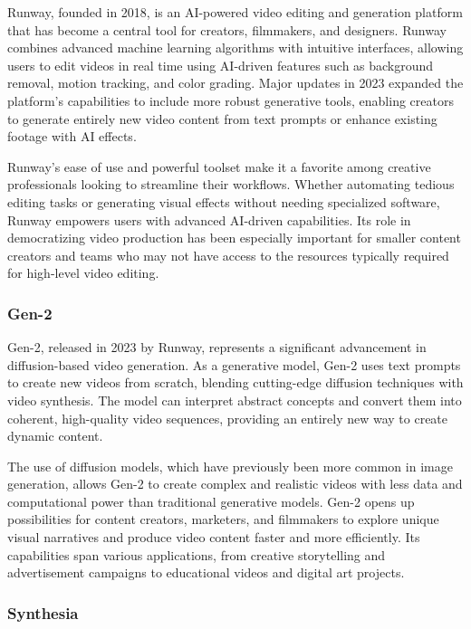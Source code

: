 Runway, founded in 2018, is an AI-powered video editing and generation platform that has become a central tool for creators, filmmakers, and designers. 
Runway combines advanced machine learning algorithms with intuitive interfaces, allowing users to edit videos in real time using AI-driven features such as background removal, motion tracking, and color grading. 
Major updates in 2023 expanded the platform’s capabilities to include more robust generative tools, enabling creators to generate entirely new video content from text prompts or enhance existing footage with AI effects.

Runway’s ease of use and powerful toolset make it a favorite among creative professionals looking to streamline their workflows. 
Whether automating tedious editing tasks or generating visual effects without needing specialized software, Runway empowers users with advanced AI-driven capabilities. 
Its role in democratizing video production has been especially important for smaller content creators and teams who may not have access to the resources typically required for high-level video editing.

\subsubsection{Gen-2}

Gen-2, released in 2023 by Runway, represents a significant advancement in diffusion-based video generation. 
As a generative model, Gen-2 uses text prompts to create new videos from scratch, blending cutting-edge diffusion techniques with video synthesis. 
The model can interpret abstract concepts and convert them into coherent, high-quality video sequences, providing an entirely new way to create dynamic content.

The use of diffusion models, which have previously been more common in image generation, allows Gen-2 to create complex and realistic videos with less data and computational power than traditional generative models. 
Gen-2 opens up possibilities for content creators, marketers, and filmmakers to explore unique visual narratives and produce video content faster and more efficiently. 
Its capabilities span various applications, from creative storytelling and advertisement campaigns to educational videos and digital art projects.

\subsubsection{Synthesia}

